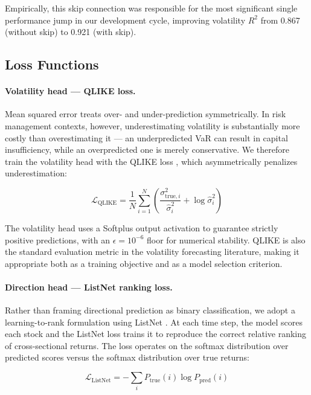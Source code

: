 \documentclass[12pt, a4paper]{article}
\newcommand{\hatσ}{\hat{\sigma}}
\begin{document}
Empirically, this skip connection was responsible for the most significant single performance jump in our development cycle, improving volatility $R^2$ from 0.867 (without skip) to 0.921 (with skip).

\subsection{Loss Functions}

\paragraph{Volatility head --- QLIKE loss.}
Mean squared error treats over- and under-prediction symmetrically. In risk management contexts, however, underestimating volatility is substantially more costly than overestimating it --- an underpredicted VaR can result in capital insufficiency, while an overpredicted one is merely conservative. We therefore train the volatility head with the QLIKE loss \citep{patton2011volatility}, which asymmetrically penalizes underestimation:

\begin{equation}
    \mathcal{L}_{\text{QLIKE}} = \frac{1}{N} \sum_{i=1}^{N} \left( \frac{\sigma^2_{\text{true},i}}{\hat{\sigma}^2_i} + \log \hat{\sigma}^2_i \right)
\end{equation}

The volatility head uses a Softplus output activation to guarantee strictly positive predictions, with an $\epsilon=10^{-6}$ floor for numerical stability. QLIKE is also the standard evaluation metric in the volatility forecasting literature, making it appropriate both as a training objective and as a model selection criterion.

\paragraph{Direction head --- ListNet ranking loss.}
Rather than framing directional prediction as binary classification, we adopt a learning-to-rank formulation using ListNet \citep{cao2007learning}. At each time step, the model scores each stock and the ListNet loss trains it to reproduce the correct relative ranking of cross-sectional returns. The loss operates on the softmax distribution over predicted scores versus the softmax distribution over true returns:

\begin{equation}
    \mathcal{L}_{\text{ListNet}} = -\sum_{i} P_{\text{true}}(i) \log P_{\text{pred}}(i)
\end{equation}
\end{document}

